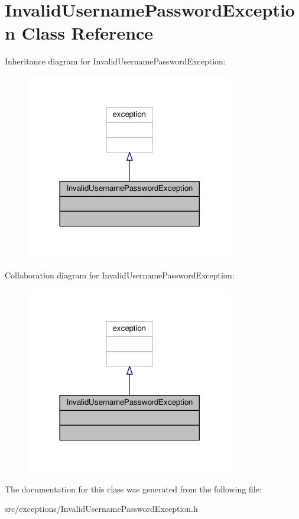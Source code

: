 \hypertarget{classInvalidUsernamePasswordException}{}\section{Invalid\+Username\+Password\+Exception Class Reference}
\label{classInvalidUsernamePasswordException}


Inheritance diagram for Invalid\+Username\+Password\+Exception\+:\nopagebreak
\begin{figure}[H]
\begin{center}
\leavevmode
\includegraphics[width=257pt]{d3/d9f/classInvalidUsernamePasswordException__inherit__graph}
\end{center}
\end{figure}


Collaboration diagram for Invalid\+Username\+Password\+Exception\+:\nopagebreak
\begin{figure}[H]
\begin{center}
\leavevmode
\includegraphics[width=257pt]{d3/dcd/classInvalidUsernamePasswordException__coll__graph}
\end{center}
\end{figure}


The documentation for this class was generated from the following file\+:\begin{DoxyCompactItemize}
\item 
src/exceptions/Invalid\+Username\+Password\+Exception.\+h\end{DoxyCompactItemize}
